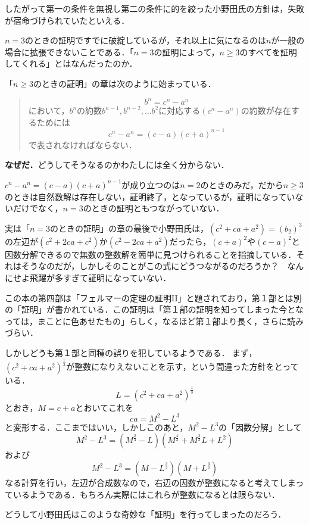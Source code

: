 したがって第一の条件を無視し第二の条件に的を絞った小野田氏の方針は，失敗が宿命づけられていたといえる．

$n=3$のときの証明ですでに破綻しているが，それ以上に気になるのは$n$が一般の場合に拡張できないことである．「$n=3$の証明によって，$n\geq 3$のすべてを証明してくれる」とはなんだったのか．

「$n\geq 3$のときの証明」の章は次のように始まっている．

\begin{quotation}
\[b^n=c^n-a^n\]
において，$b^n$の約数$b^{n-1},b^{n-2},\dots b^2$に対応する$(c^n-a^n)$の約数が存在するためには
\[c^n-a^n=(c-a)(c+a)^{n-1}\]
で表されなければならない．
\end{quotation}

\textbf{なぜだ．}どうしてそうなるのかわたしには全く分からない．

$c^n-a^n=(c-a)(c+a)^{n-1}$が成り立つのは$n=2$のときのみだ，だから$n\geq 3$のときは自然数解は存在しない，証明終了，となっているが，証明になっていないだけでなく，$n=3$のときの証明ともつながっていない．


実は「$n=3$のときの証明」の章の最後で小野田氏は，$(c^2+ca+a^2)=(b_2)^3$の左辺が$(c^2+2ca+c^2)$か$(c^2-2ca+a^2)$だったら，$(c+a)^2$や$(c-a)^2$と因数分解できるので無数の整数解を簡単に見つけられることを指摘している．それはそうなのだが，しかしそのことがこの式にどうつながるのだろうか？　なんにせよ飛躍が多すぎて証明になっていない．


この本の第四部は「フェルマーの定理の証明II」と題されており，第１部とは別の「証明」が書かれている．この証明は「第１部の証明を知ってしまった今となっては，まことに色あせたもの」らしく，なるほど第１部より長く，さらに読みづらい．

しかしどうも第１部と同種の誤りを犯しているようである．
まず，$(c^2+ca+a^2)^{\frac{1}{3}}$が整数になりえないことを示す，という間違った方針をとっている．
\[L=(c^2+ca+a^2)^{\frac{1}{3}}\]
とおき，$M=c+a$とおいてこれを
\[ca=M^2-L^3\]
と変形する．ここまではいい，しかしこのあと，$M^2-L^3$の「因数分解」として
\[M^2-L^3=(M^{\frac{2}{3}}-L)(M^{\frac{4}{3}}+M^{\frac{2}{3}}L+L^2)\]
および
\[M^2-L^3=(M-L^{\frac{3}{2}})(M+L^{\frac{3}{2}})\]
なる計算を行い，左辺が合成数なので，右辺の因数が整数になると考えてしまっているようである．もちろん実際にはこれらが整数になるとは限らない．


どうして小野田氏はこのような奇妙な「証明」を行ってしまったのだろう．

